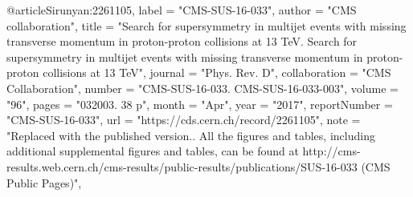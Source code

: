 @article{Sirunyan:2261105,
      label          = "CMS-SUS-16-033",
      author        = "{CMS collaboration}",
      title         = "{Search for supersymmetry in multijet events with missing
                       transverse momentum in proton-proton collisions at 13 TeV.
                       Search for supersymmetry in multijet events with missing
                       transverse momentum in proton-proton collisions at 13 TeV}",
      journal       = "Phys. Rev. D",
      collaboration = "CMS Collaboration",
      number        = "CMS-SUS-16-033. CMS-SUS-16-033-003",
      volume        = "96",
      pages         = "032003. 38 p",
      month         = "Apr",
      year          = "2017",
      reportNumber  = "CMS-SUS-16-033",
      url           = "https://cds.cern.ch/record/2261105",
      note          = "Replaced with the published version.. All the figures and
                       tables, including additional supplemental figures and
                       tables, can be found at
                       http://cms-results.web.cern.ch/cms-results/public-results/publications/SUS-16-033
                       (CMS Public Pages)",
}

